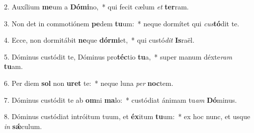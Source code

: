 2. Auxílium \textbf{me}um a \textbf{Dó}\textbf{mi}no,~*  qui fecit cælum \textit{et} \textbf{ter}ram.\

3. Non det in commotiónem \textbf{pe}dem \textbf{tu}um:~*  neque dormítet qui \textit{cus}\textbf{tó}dit te.\

4. Ecce, non dormitábit \textbf{ne}que \textbf{dór}\textbf{mi}et,~*  qui custó\textit{dit} \textbf{Is}raël.\

5. Dóminus custódit te, Dóminus pro\textbf{téc}tio \textbf{tu}a,~*  super manum déxte\textit{ram} \textbf{tu}am.\

6. Per diem \textbf{sol} non \textbf{u}\textbf{ret} te:~*  neque luna \textit{per} \textbf{noc}tem.\

7. Dóminus custódit te ab \textbf{om}ni \textbf{ma}lo:~*  custódiat ánimam tu\textit{am} \textbf{Dó}minus.\

8. Dóminus custódiat intróitum tuum, et \textbf{éx}itum \textbf{tu}um:~*  ex hoc nunc, et usque \textit{in} \textbf{sǽ}culum.\

